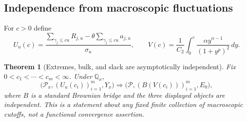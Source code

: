 \documentclass[11pt]{article}
\newtheorem{theorem}{Theorem}[section]
\theoremstyle{definition}
\theoremstyle{remark}
\begin{document}
\subsection{Independence from macroscopic fluctuations}

For $c>0$ define
\[
 U_u(c)=\frac{\sum_{\gamma_j\le cu}R_{j,u}
                   -\theta\sum_{\gamma_j\le cu}a_{j,u}}{\sigma_u},
 \qquad
 V(c)=\frac1{C_2}\int_0^c
             \frac{\alpha y^{\alpha-1}}{(1+y^p)^2}\,dy.
\]

\begin{theorem}[Extremes, bulk, and slack are asymptotically independent]
\label{ext:thm:bulk}
Fix $0<c_1<\cdots<c_m<\infty$.  Under $\mathbb Q_x$,
\[
 \bigl(\mathcal P_x,(U_u(c_i))_{i=1}^m,Y_x\bigr)
 \Longrightarrow
 \bigl(\mathcal P,(B(V(c_i)))_{i=1}^m,E_0\bigr),
\]
where $B$ is a standard Brownian bridge and the three displayed objects
are independent.  This is a statement about any fixed finite collection
of macroscopic cutoffs, not a functional convergence assertion.
\end{theorem}
\end{document}
